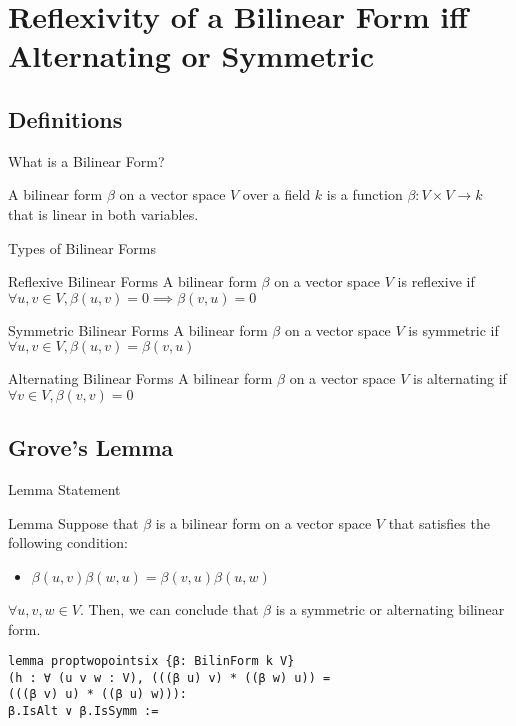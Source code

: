 \documentclass[svgnames]{beamer}
\begin{document}
\section{Reflexivity of a Bilinear Form iff Alternating or Symmetric}
\subsection{Definitions}

\begin{frame}{What is a Bilinear Form?}

\begin{Definition}
A bilinear form $\beta$ on a vector space $V$ over a field $k$ is a function $\beta : V \times V \rightarrow k $ that is linear in both variables.
\end{Definition}

\end{frame}

\begin{frame}{Types of Bilinear Forms}
\begin{block}{Reflexive Bilinear Forms}
A bilinear form $\beta$ on a vector space $V$ is reflexive if $\forall u, v \in V, \beta(u,v) = 0 \implies \beta(v,u) = 0$
\end{block}
\begin{block}{Symmetric Bilinear Forms}
A bilinear form $\beta$ on a vector space $V$ is symmetric if $\forall u, v \in V, \beta(u,v) = \beta(v,u) $
\end{block}
\begin{block}{Alternating Bilinear Forms}
A bilinear form $\beta$ on a vector space $V$ is alternating if $\forall v \in V, \beta(v,v) = 0$
\end{block}
\end{frame}



\subsection{Grove's Lemma}
\begin{frame}[label={sec:o}, fragile]{Lemma Statement}
\begin{block}{Lemma}
Suppose that $\beta$ is a bilinear form on a vector space $V$ that satisfies the following condition:
\begin{itemize}
\item $\beta(u,v)\beta(w,u) = \beta(v,u)\beta(u,w)$
\end{itemize}
$\forall u,v,w \in V$. Then, we can conclude that $\beta$ is a symmetric or alternating bilinear form.
\end{block}

{\scriptsize
\begin{verbatim}
lemma proptwopointsix {β: BilinForm k V}
(h : ∀ (u v w : V), (((β u) v) * ((β w) u)) = 
(((β v) u) * ((β u) w))): 
β.IsAlt ∨ β.IsSymm := 
\end{verbatim}
}

\end{frame}
\end{document}
